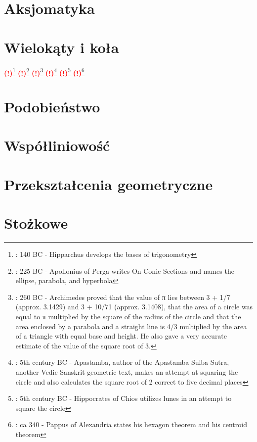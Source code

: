 \documentclass{greaseproof}
\newcommand{\todofoot}[1]{\textcolor{red}{\textbf{(!)}\footnote{\textbf{\color{red}{Do zrobienia}}: #1}}}
\begin{document}


\chapter{Aksjomatyka}


\chapter{Wielokąty i koła}


\todofoot{140 BC - Hipparchus develops the bases of trigonometry}
\todofoot{225 BC - Apollonius of Perga writes On Conic Sections and names the ellipse, parabola, and hyperbola}
\todofoot{260 BC - Archimedes proved that the value of π lies between 3 + 1/7 (approx. 3.1429) and 3 + 10/71 (approx. 3.1408), that the area of a circle was equal to π multiplied by the square of the radius of the circle and that the area enclosed by a parabola and a straight line is 4/3 multiplied by the area of a triangle with equal base and height. He also gave a very accurate estimate of the value of the square root of 3.}
\todofoot{5th century BC - Apastamba, author of the Apastamba Sulba Sutra, another Vedic Sanskrit geometric text, makes an attempt at squaring the circle and also calculates the square root of 2 correct to five decimal places}
\todofoot{5th century BC - Hippocrates of Chios utilizes lunes in an attempt to square the circle}
\todofoot{ca 340 - Pappus of Alexandria states his hexagon theorem and his centroid theorem}

\chapter{Podobieństwo}


\chapter{Współliniowość}


\chapter{Przekształcenia geometryczne}


\chapter{Stożkowe}

\end{document}

